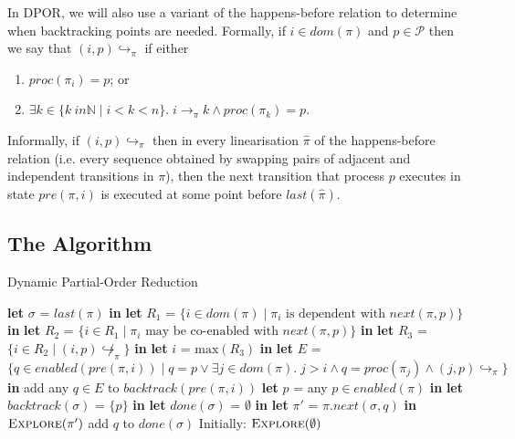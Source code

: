 \documentclass[12pt,a4paper,twoside,openright]{report}
\newcommand{\Let}[2]{\State \textbf{let} #1 = #2 \textbf{in}}
\begin{document}
In DPOR, we will also use a variant of the
happens-before relation to determine when
backtracking points are needed. Formally, 
if $i \in \textit{dom}(\pi)$ and $p \in
\mathcal{P}$ then we
say that $(i, p)\!\hookrightarrow_\pi$ if
either
\begin{enumerate}
	\item $\textit{proc}(\pi_i) = p$; or
	\item $\exists k \in \{k \ in \mathbb{N} \mid i < k < n\}.\;
		i \longrightarrow_\pi k \wedge \textit{proc}(\pi_k) = p$.
\end{enumerate}
Informally, if $(i, p)\!\hookrightarrow_\pi$ then
in every linearisation $\hat{\pi}$ of the
happens-before relation (i.e. every sequence
obtained by swapping pairs of adjacent and
independent transitions in $\pi$), then the next
transition that process $p$ executes in
state $\textit{pre}(\pi, i)$ is executed
at some point before $\textit{last}(\hat{\pi})$.

\subsection{The Algorithm}

\begin{algorithm} \caption{Dynamic Partial-Order Reduction}
	\label{dpor-outline} \begin{algorithmic}[1]
		\Let{$\sigma$}{$\textit{last}(\pi)$}
			\Let{$R_1$}{$\{i \in \textit{dom}(\pi) \mid
				\pi_i \text{ is dependent with } \textit{next}(\pi, p)\}$}
			\Let{$R_2$}{$\{i \in R_1 \mid
				\pi_i \text{ may be co-enabled with } \textit{next}(\pi, p)\}$}
			\Let{$R_3$}{$\{i \in R_2 \mid (i, p)\!\not \hookrightarrow_\pi\}$}
				\Let{$i$}{$\text{max}(R_3)$}
				\Let{$E$}{$\{q \in \textit{enabled}(\textit{pre}(\pi, i)) \mid
					q = p \vee \exists j \in \textit{dom}(\pi).\; j > i \wedge
					q = \textit{proc}(\pi_j) \wedge (j, p)\hookrightarrow_\pi
					\}$}
					add any $q \in E$ to $\textit{backtrack}(\textit{pre}(\pi, i))$
				 \EndIf
			\EndIf
		\EndFor
			\Let{$p$}{any $p \in \textit{enabled}(\pi)$}
			\Let{$\textit{backtrack}(\sigma)$}{$\{p\}$}
			\Let{$\textit{done}(\sigma)$}{$\emptyset$}
				\Let{$\pi'$}{$\pi.\textit{next}(\sigma,q)$}
				\State $\textsc{Explore}(\pi')$
				\State add $q$ to $\textit{done}(\sigma)$
			\EndWhile
		\EndIf
		\EndProcedure
		\State
		\State Initially: $\textsc{Explore}(\emptyset)$
	\end{algorithmic}
\end{algorithm}
\end{document}
